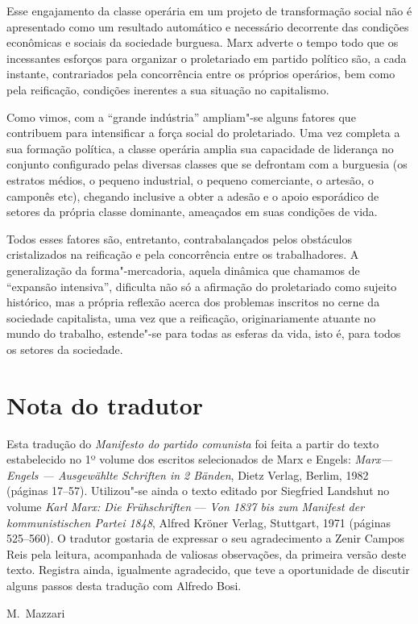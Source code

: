 Esse engajamento da classe operária em um projeto de transformação
social não é apresentado como um resultado automático e necessário
decorrente das condições econômicas e sociais da sociedade burguesa.
Marx adverte o tempo todo que os incessantes esforços para organizar o
proletariado em partido político são, a cada instante, contrariados
pela concorrência entre os próprios operários, bem como pela reificação,
condições inerentes a sua situação no capitalismo.

Como vimos, com a “grande indústria” ampliam"-se alguns fatores que
contribuem para intensificar a força social do proletariado. Uma vez
completa a sua formação política, a classe operária amplia sua
capacidade de liderança no conjunto configurado pelas diversas classes
que se defrontam com a burguesia (os estratos médios, o pequeno
industrial, o pequeno comerciante, o artesão, o camponês etc), chegando
inclusive a obter a adesão e o apoio esporádico de setores da própria
classe dominante, ameaçados em suas condições de vida. 

Todos esses fatores são, entretanto, contrabalançados pelos obstáculos
cristalizados na reificação e pela concorrência entre os trabalhadores.
A generalização da forma"-mercadoria, aquela dinâmica que chamamos de
“expansão intensiva”, dificulta não só a afirmação do proletariado como
sujeito histórico, mas a própria reflexão acerca dos problemas
inscritos no cerne da sociedade capitalista, uma vez que a reificação,
originariamente atuante no mundo do trabalho, estende"-se para todas
as esferas da vida, isto é, para todos os setores da sociedade.

\chapter{Nota do tradutor}

Esta tradução do \textit{Manifesto do partido comunista} foi feita a
partir do texto estabelecido no 1º volume dos escritos selecionados de
Marx e Engels: \textit{Marx---Engels --- Ausgewählte Schriften in 2
Bänden}, Dietz Verlag, Berlim, 1982 (páginas 17--57). Utilizou"-se
ainda o texto editado por Siegfried Landshut no volume \textit{Karl
Marx: Die  Frühschriften} --- \textit{Von 1837 bis zum Manifest der
kommunistischen Partei 1848}, Alfred Kröner Verlag, Stuttgart, 1971
(páginas 525--560). O tradutor gostaria de expressar o seu
agradecimento a Zenir Campos Reis pela leitura, acompanhada de valiosas
observações, da primeira versão deste texto. Registra ainda, igualmente
agradecido, que teve a oportunidade de discutir alguns passos desta
tradução com Alfredo Bosi.\bigskip

\hfill M.~Mazzari 

